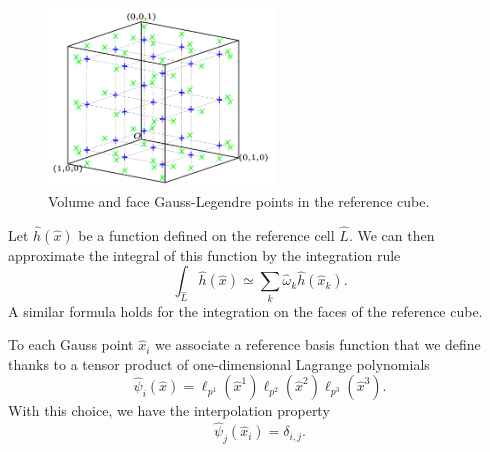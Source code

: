 \documentclass[preprint]{sig-alternate}
\begin{document}
\begin{figure}[h]
  \centering
  \includegraphics[width=6cm]{ref_element_pg}
  \caption{Volume and face Gauss-Legendre points in the reference cube.\label{fig:cube-pg}}
\end{figure}

Let $\hat h(\hat x)$ be a function defined on the reference cell $\hat L$. We can then approximate the integral of this function by the integration rule
\begin{equation}\label{eq:quadrule}
\int_{\hat L} \hat h(\hat x) \simeq \sum_k \hat \omega_k \hat h(\hat x_k).
\end{equation}
A similar formula holds for the integration on the faces of the reference cube.

To each Gauss point $\hat x _i$ we associate a reference basis function that we define thanks to a tensor product of one-dimensional Lagrange polynomials
$$\hat \psi_i(\hat x)=\ell_{p^1}(\hat x^1)\ell_{p^2}(\hat x^2)\ell_{p^3}(\hat x^3).$$With this choice, we have the interpolation property
$$\hat \psi_j(\hat x_i)=\delta_{i,j}.$$
\end{document}

